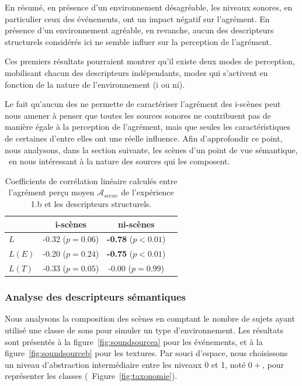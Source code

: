 \documentclass[twoside,twocolumn]{article}
\begin{document}
En résumé, en présence d'un environnement désagréable, les niveaux sonores, en particulier ceux des événements, ont un impact négatif sur l'agrément. En présence d'un environnement agréable, en revanche, aucun des descripteurs structurels considérés ici ne semble influer sur la perception de l'agrément. 

Ces premiers résultats pourraient montrer qu'il existe deux modes de perception, mobilisant chacun des descripteurs indépendants, modes qui s'activent en fonction de la nature de l'environnement (i ou ni).

Le fait qu'aucun des   ne permette de caractériser l'agrément des i-scènes peut nous amener à penser que toutes les sources sonores ne contribuent pas de manière égale à la perception de l'agrément, mais que seules les caractéristiques de certaines d'entre elles ont une réelle influence. Afin d'approfondir ce point, nous analysons, dans la section suivante, les scènes d'un point de vue sémantique, \ie~en nous intéressant à la nature des sources qui les composent. 


\begin{table}[t]
\centering
\begin{tabular}{l c c c} 
               & i-scènes                   & ni-scènes    \\
\hline
$L$            & -0.32 ($p=0.06$)           & \textbf{-0.78} ($p<0.01$)\\
$L(E)$         & -0.20 ($p=0.24$)           & \textbf{-0.75} ($p<0.01$)\\
$L(T)$         & -0.33 ($p=0.05$)           &  -0.00 ($p=0.99$) \\
\hline
\end{tabular}
\vspace{0.5mm}
\caption{Coefficients de corrélation linéaire calculés entre l'agrément perçu moyen $\mathcal{A}_{scene}$ de l'expérience 1.b et les descripteurs structurels.}
\label{tab:corrStructA}
\end{table}

\subsubsection*{Analyse des descripteurs sémantiques}

Nous analysons la composition des scènes en comptant le nombre de sujets ayant utilisé une classe de sons pour simuler un type d'environnement. Les résultats sont présentés à la figure~\ref{fig:soundsourcea} pour les événements, et à la figure~\ref{fig:soundsourceb} pour les textures. Par souci d'espace, nous choisissons un niveau d'abstraction intermédiaire entre les niveaux 0 et 1, noté $0+$, pour représenter les classes (\cf~Figure~\ref{fig:taxonomie}).
\end{document}
